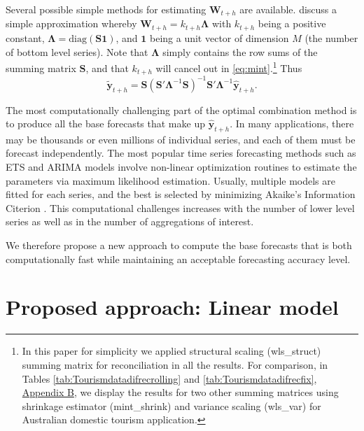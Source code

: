 \documentclass[11pt,a4paper,]{article}
\begin{document}
Several possible simple methods for estimating \(\bm{W}_{t+h}\) are available. \textcite{mint2018} discuss a simple approximation whereby \(\bm{W}_{t+h} = k_{t+h} \bm{\Lambda}\) with \(k_{t+h}\) being a positive constant, \(\bm{\Lambda} = \text{diag}(\bm{S}\bm{1})\), and \(\bm{1}\) being a unit vector of dimension \(M\) (the number of bottom level series). Note that \(\bm{\Lambda}\) simply contains the row sums of the summing matrix \(\bm{S}\), and that \(k_{t+h}\) will cancel out in \eqref{eq:mint}.\footnote{In this paper for simplicity we applied structural scaling (wls\_struct) summing matrix for reconciliation in all the results. For comparison, in Tables \ref{tab:Tourismdatadifrecrolling} and \ref{tab:Tourismdatadifrecfix}, \protect\hyperlink{appendixB}{Appendix B}, we display the results for two other summing matrices using shrinkage estimator (mint\_shrink) and variance scaling (wls\_var) for Australian domestic tourism application.} Thus
\begin{equation}\label{eq:mint2}
  \tilde{\bm{y}}_{t+h}=\bm{S}(\bm{S}'\bm{\Lambda}^{-1}\bm{S})^{-1}\bm{S}'\bm{\Lambda}^{-1}\hat{\bm{y}}_{t+h}.
\end{equation}

The most computationally challenging part of the optimal combination method is to produce all the base forecasts that make up \(\hat{\bm{y}}_{t+h}\). In many applications, there may be thousands or even millions of individual series, and each of them must be forecast independently. The most popular time series forecasting methods such as ETS and ARIMA models \autocite{fpp2} involve non-linear optimization routines to estimate the parameters via maximum likelihood estimation. Usually, multiple models are fitted for each series, and the best is selected by minimizing Akaike's Information Citerion \autocite{akaike1998information}. This computational challenges increases with the number of lower level series as well as in the number of aggregations of interest.

We therefore propose a new approach to compute the base forecasts that is both computationally fast while maintaining an acceptable forecasting accuracy level.

\hypertarget{proposed-approach-linear-model}{%
\section{\texorpdfstring{Proposed approach: Linear model \label{sec:proposedapproach1}}{Proposed approach: Linear model }}\label{proposed-approach-linear-model}}
\end{document}
